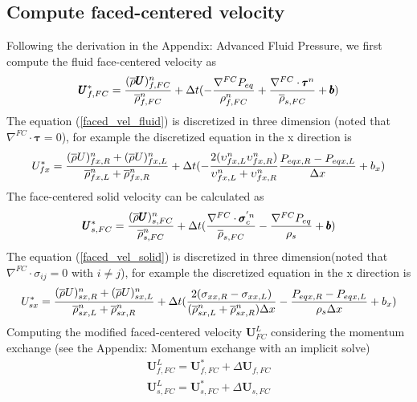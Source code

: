 \documentclass[preprint,12pt]{elsarticle}
\begin{document}
\subsection{\textsf{Compute faced-centered velocity}}
Following the derivation in the Appendix: Advanced Fluid Pressure, we first compute the fluid face-centered velocity as\\
%
%
\begin{equation}
\label{faced_vel_fluid}
    \pmb{U}_{f,FC}^{*} = \frac{(\overline{\rho} \pmb{U})_{f,FC}^n}{\overline{\rho}_{f,FC}^n} + \Delta{t} (-\frac{\nabla^{FC} P_{eq}}{\rho_{f,FC}^n}  +\frac{\nabla^{FC} \cdot \pmb{\tau}^{n}}{\overline{\rho}_{s,FC}}+ \pmb{b})
\end {equation}
%
%
The equation (\ref{faced_vel_fluid}) is discretized in three dimension (noted that $\nabla^{FC} \cdot \pmb{\tau} = 0$), for example the discretized equation in the x direction is
%
\begin{equation}
U_{fx}^{*} = \frac{(\overline{\rho} U)_{fx,R}^n + (\overline{\rho} U)_{fx,L}^n}{\overline{\rho}_{fx,L}^n + \overline{\rho}_{fx,R}^n} + \Delta{t} (-\frac{2(\upsilon_{fx,L}^n \upsilon_{fx,R}^n)}{\upsilon_{fx,L}^n + \upsilon_{fx,R}^n} \frac{P_{eqx,R} - P_{eqx,L}}{\Delta x} + b_x)
\end {equation}
%
%
The face-centered solid velocity can be calculated as
\begin{equation}
\label{faced_vel_solid}
\pmb{U}_{s,FC}^{*} = \frac{(\overline{\rho} \pmb{U})_{s,FC}^n}{\overline{\rho}_{s,FC}^n} + \Delta{t} ( \frac{\nabla^{FC} \cdot \pmb{\sigma}_c^{'n}}{\overline{\rho}_{s,FC}}    - \frac{\nabla^{FC} P_{eq}}{\rho_s}   + \pmb{b})
\end {equation}
The equation (\ref{faced_vel_solid}) is discretized in three dimension(noted that $\nabla^{FC} \cdot \sigma_{ij} = 0$ with $i \neq j$), for example the discretized equation in the x direction is
%
\begin{equation}
U_{sx}^{*} = \frac{(\overline{\rho} U)_{sx,R}^n + (\overline{\rho} U)_{sx,L}^n}{\overline{\rho}_{sx,L}^n + \overline{\rho}_{sx,R}^n} + \Delta{t} (\frac{2(\sigma_{xx,R} - \sigma_{xx,L})}{(\overline{\rho}_{sx,L}^n + \overline{\rho}_{sx,R}^n)\Delta x}-\frac{P_{eqx,R} - P_{eqx,L}}{\rho_s \Delta x} + b_x)
\end {equation}
%
%
Computing the modified faced-centered velocity $\pmb{U}_{FC}^{L}$ considering the momentum exchange (see the Appendix: Momentum exchange with an implicit solve)
%
\begin{equation}
\begin{gathered}
   \pmb{U}_{f,FC}^{L} = \pmb{U}_{f,FC}^{*} + \Delta \pmb{U}_{f,FC}\\
   \pmb{U}_{s,FC}^{L} = \pmb{U}_{s,FC}^{*} + \Delta \pmb{U}_{s,FC}
\end {gathered}
\end {equation}
\end{document}
